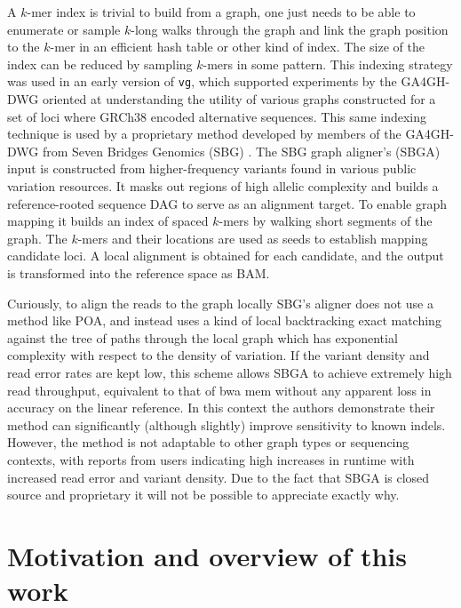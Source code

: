 A $k$-mer index is trivial to build from a graph, one just needs to be able to enumerate or sample $k$-long walks through the graph and link the graph position to the $k$-mer in an efficient hash table or other kind of index.
The size of the index can be reduced by sampling $k$-mers in some pattern.
This indexing strategy was used in an early version of {\tt vg}, which supported experiments by the GA4GH-DWG \cite{novak2017genome} oriented at understanding the utility of various graphs constructed for a set of loci where GRCh38 encoded alternative sequences.
This same indexing technique is used by a proprietary method developed by members of the GA4GH-DWG from Seven Bridges Genomics (SBG) \cite{rakocevic2018fast}.
The SBG graph aligner's (SBGA) input is constructed from higher-frequency variants found in various public variation resources.
It masks out regions of high allelic complexity and builds a reference-rooted sequence DAG to serve as an alignment target.
To enable graph mapping it builds an index of spaced $k$-mers by walking short segments of the graph.
The $k$-mers and their locations are used as seeds to establish mapping candidate loci.
A local alignment is obtained for each candidate, and the output is transformed into the reference space as BAM.

Curiously, to align the reads to the graph locally SBG's aligner does not use a method like POA, and instead uses a kind of local backtracking exact matching against the tree of paths through the local graph which has exponential complexity with respect to the density of variation.
If the variant density and read error rates are kept low, this scheme allows SBGA to achieve extremely high read throughput, equivalent to that of bwa mem without any apparent loss in accuracy on the linear reference.
In this context the authors demonstrate their method can significantly (although slightly) improve sensitivity to known indels.
However, the method is not adaptable to other graph types or sequencing contexts, with reports from users indicating high increases in runtime with increased read error and variant density.
Due to the fact that SBGA is closed source and proprietary it will not be possible to appreciate exactly why.

\section{Motivation and overview of this work}


